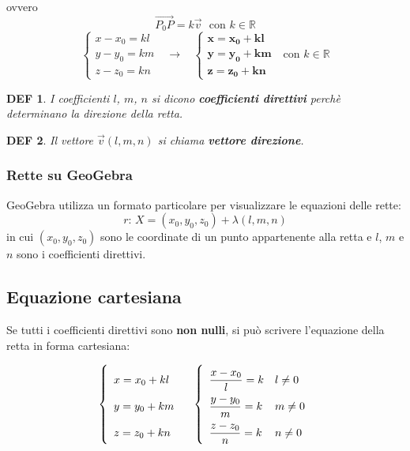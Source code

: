 \documentclass{article}     %
\newtheorem*{definition}{DEF}
\begin{document}
            ovvero
            \[\overrightarrow{P_0P}=k\overrightarrow{v}~~~\text{con }k\in\mathbb{R}\]
            \[\left\{\begin{array}{l}
                x-x_0=kl\\
                y-y_0=km\\
                z-z_0=kn
            \end{array}\right.~~~\rightarrow~~~~
            \left\{\begin{array}{l}
                \mathbf{x=x_0+kl}\\
                \mathbf{y=y_0+km}\\
                \mathbf{z=z_0+kn}
            \end{array}\right.~~~\text{con }k\in\mathbb{R}\]
            \begin{definition}
                I coefficienti $l$, $m$, $n$ si dicono \textbf{coefficienti direttivi} perchè determinano la direzione della retta.
            \end{definition}
            \begin{definition}
                Il vettore $\overrightarrow{v}(l,m,n)$ si chiama \textbf{vettore direzione}.
            \end{definition}
            \subsubsection{Rette su GeoGebra}
                GeoGebra utilizza un formato particolare per visualizzare le equazioni delle rette:
                \[r: \,X =(x_0,y_0,z_0)+\lambda(l,m,n)\]
                in cui $(x_0,y_0,z_0)$ sono le coordinate di un punto appartenente alla retta e $l$, $m$ e $n$ sono i coefficienti direttivi.
        \subsection{Equazione cartesiana}
            Se tutti i coefficienti direttivi sono \textbf{non nulli}, si può scrivere l'equazione della retta in forma cartesiana:
            
            \[\left\{\begin{array}{l}
                x=x_0+kl\\
                y=y_0+km\\
                z=z_0+kn
            \end{array}\right.~~~
            \left\{\renewcommand{\arraystretch}{2}\begin{array}{ll}
                \dfrac{x-x_0}{l}=k&l\neq0\\
                \dfrac{y-y_0}{m}=k&m\neq0\\
                \dfrac{z-z_0}{n}=k&n\neq0
            \end{array}\right.\]
\end{document}

